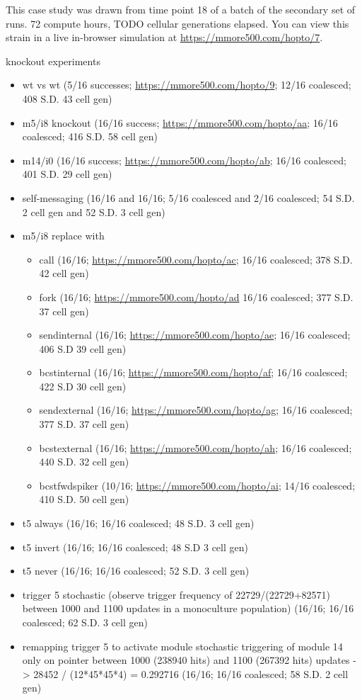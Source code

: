 
This case study was drawn from time point 18 of a batch of the secondary set of runs.
72 compute hours, TODO cellular generations elapsed.
You can view this strain in a live in-browser simulation at \url{https://mmore500.com/hopto/7}.

knockout experiments
\begin{itemize}
  \item wt vs wt (5/16 successes; \url{https://mmore500.com/hopto/9}; 12/16 coalesced; 408 S.D. 43 cell gen)
  \item m5/i8 knockout (16/16 success; \url{https://mmore500.com/hopto/aa}; 16/16 coalesced; 416 S.D. 58 cell gen)
  \item m14/i0 (16/16 success; \url{https://mmore500.com/hopto/ab}; 16/16 coalesced; 401 S.D. 29 cell gen)
  \item self-messaging (16/16 and 16/16; 5/16 coalesced and 2/16 coalesced; 54 S.D. 2 cell gen and 52 S.D. 3 cell gen)
  \item m5/i8 replace with
  \begin{itemize}
	\item call (16/16; \url{https://mmore500.com/hopto/ac}; 16/16 coalesced; 378 S.D. 42 cell gen)
    \item fork (16/16; \url{https://mmore500.com/hopto/ad} 16/16 coalesced; 377 S.D. 37 cell gen)
    \item sendinternal (16/16; \url{https://mmore500.com/hopto/ae}; 16/16 coalesced; 406 S.D 39 cell gen)
    \item bcstinternal (16/16; \url{https://mmore500.com/hopto/af}; 16/16 coalesced; 422 S.D 30 cell gen)
    \item sendexternal (16/16; \url{https://mmore500.com/hopto/ag}; 16/16 coalesced; 377 S.D. 37 cell gen)
    \item bcstexternal (16/16; \url{https://mmore500.com/hopto/ah}; 16/16 coalesced; 440 S.D. 32 cell gen)
    \item bcstfwdspiker (10/16; \url{https://mmore500.com/hopto/ai}; 14/16 coalesced; 410 S.D. 50 cell gen)
  \end{itemize}
  \item t5 always (16/16; 16/16 coalesced; 48 S.D. 3 cell gen)
  \item t5 invert (16/16; 16/16 coalesced; 48 S.D 3 cell gen)
  \item t5 never (16/16; 16/16 coalesced; 52 S.D. 3 cell gen)
  \item trigger 5 stochastic (observe trigger frequency of 22729/(22729+82571) between 1000 and 1100 updates in a monoculture population) (16/16; 16/16 coalesced; 62 S.D. 3 cell gen)
  \item remapping trigger 5 to activate module stochastic triggering of module 14 only on pointer between 1000 (238940 hits) and 1100 (267392 hits) updates -> 28452 / (12*45*45*4) = 0.292716 (16/16; 16/16 coalesced; 58 S.D. 2 cell gen)
\end{itemize}


